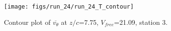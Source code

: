 \begin{figure}[H]
\centering
\texttt{[image: figs/run\_24/run\_24\_T\_contour]}
\caption{Contour plot of $\overline{v_{\theta}}$ at $z/c$=7.75, $V_{free}$=21.09, station 3.}
\label{fig:run_24_T_contour}
\end{figure}


